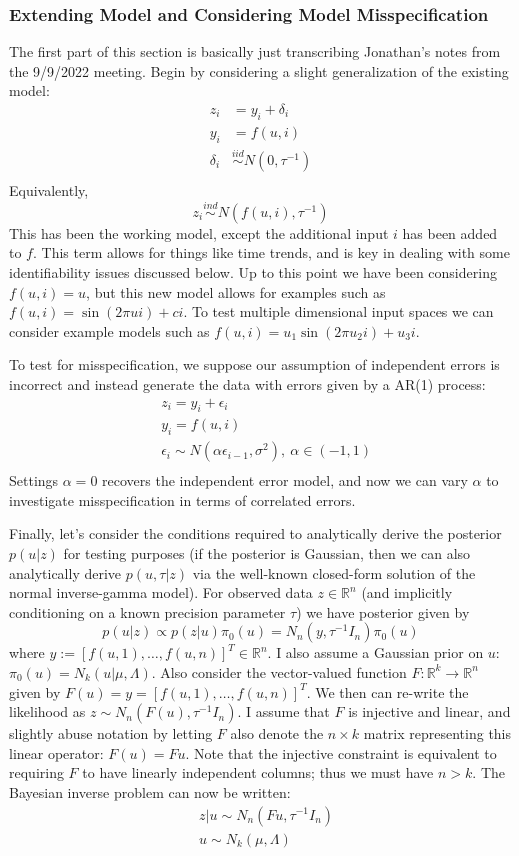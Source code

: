 \documentclass[12pt]{article}
\newcommand{\R}{\mathcal{R}}
\def\R{\mathbb{R}}
\begin{document}
\subsubsection{Extending Model and Considering Model Misspecification}
The first part of this section is basically just transcribing Jonathan's notes from the 9/9/2022 meeting. Begin by considering a slight generalization of the existing model: 
\begin{align*}
z_i &= y_i + \delta_i \\
y_i &= f(u, i) \\
\delta_i &\overset{iid}{\sim} N(0, \tau^{-1}) \\
\end{align*}
Equivalently, 
\[z_i \overset{ind}{\sim} N(f(u, i), \tau^{-1})\]
This has been the working model, except the additional input $i$ has been added to $f$. This term allows for things like time trends, and is key in dealing with some 
identifiability issues discussed below. Up to this point we have been considering $f(u, i) = u$, but this new model allows for examples such as
$f(u, i) = \sin(2\pi u i) + ci$. To test multiple dimensional input spaces we can consider example models such as $f(u, i) = u_1 \sin(2\pi u_2 i) + u_3 i$. 

To test for misspecification, we suppose our assumption of independent errors is incorrect and instead generate the data with errors given by a AR(1) process:
\begin{align*}
&z_i = y_i + \epsilon_i \\
&y_i = f(u, i) \\
&\epsilon_i \sim N(\alpha \epsilon_{i - 1}, \sigma^2), \ \alpha \in (-1, 1) \\
\end{align*}
Settings $\alpha = 0$ recovers the independent error model, and now we can vary $\alpha$ to investigate misspecification in terms of correlated errors. 

Finally, let's consider the conditions required to analytically derive the posterior $p(u|z)$ for testing purposes (if the posterior is Gaussian, then we can also analytically 
derive $p(u, \tau|z)$ via the well-known closed-form solution of the normal inverse-gamma model). For observed data $z \in \R^n$ (and implicitly conditioning on a known 
precision parameter $\tau$) we have posterior given by
\[p(u|z) \propto p(z|u)\pi_0(u) = N_n(y, \tau^{-1}I_n)\pi_0(u)\]
where $y := [f(u, 1), \dots, f(u, n)]^T \in \R^n$. I also assume a Gaussian prior on $u$: $\pi_0(u) = N_k(u|\mu, \Lambda)$. Also consider the vector-valued function
$F: \R^k \to \R^n$ given by $F(u) = y = [f(u, 1), \dots, f(u, n)]^T$. We then can re-write the likelihood as $z \sim N_n(F(u), \tau^{-1}I_n)$. I assume that $F$ is injective 
and linear, and slightly abuse notation by letting $F$ also denote the $n \times k$ matrix representing this linear operator: $F(u) = Fu$. Note that the injective constraint
is equivalent to requiring $F$ to have linearly independent columns; thus we must have $n > k$. The Bayesian inverse problem can now be written:
\begin{align*}
&z|u \sim N_n(Fu, \tau^{-1}I_n) \\
&u \sim N_k(\mu, \Lambda)
\end{align*}
\end{document}
